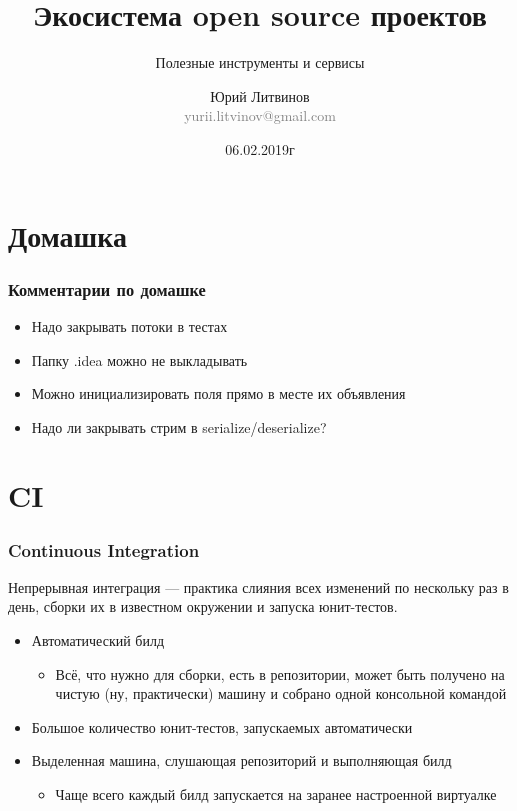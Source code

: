 \documentclass[xetex,mathserif,serif]{beamer}
\title{Экосистема open source проектов}
\subtitle{Полезные инструменты и сервисы}
\author[Юрий Литвинов]{Юрий Литвинов\\\small{\textcolor{gray}{yurii.litvinov@gmail.com}}}
\date{06.02.2019г}
\begin{document}
	\frame{\titlepage}

	\section{Домашка}

	\begin{frame}
		\frametitle{Комментарии по домашке}
		\begin{itemize}
			\item Надо закрывать потоки в тестах
			\item Папку .idea можно не выкладывать
			\item Можно инициализировать поля прямо в месте их объявления
			\item Надо ли закрывать стрим в serialize/deserialize?
		\end{itemize}
	\end{frame}

	\section{CI}

	\begin{frame}
		\frametitle{Continuous Integration}
		Непрерывная интеграция --- практика слияния всех изменений по нескольку раз в день, сборки их в известном окружении и запуска юнит-тестов.
		\begin{itemize}
			\item Автоматический билд
			\begin{itemize}
				\item Всё, что нужно для сборки, есть в репозитории, может быть получено на чистую (ну, практически) машину и собрано одной консольной командой
			\end{itemize}
			\item Большое количество юнит-тестов, запускаемых автоматически
			\item Выделенная машина, слушающая репозиторий и выполняющая билд
			\begin{itemize}
				\item Чаще всего каждый билд запускается на заранее настроенной виртуалке
			\end{itemize}
		\end{itemize}
	\end{frame}
\end{document}
